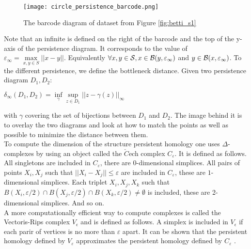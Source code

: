 \documentclass[12pt, a4paper]{article}
\begin{document}
\begin{figure}[p]
             \centering
            \texttt{[image: circle\_persistence\_barcode.png]}
        \caption{The barcode diagram of dataset from Figure \ref{fig:betti_s1}}
        \label{fig:persistence_barcode}
\end{figure}

Note that an infinite is defined on the right of the barcode and the top of the y-axis of the persistence diagram. It corresponds to the value of $\varepsilon_\infty = \max\limits_{x,y \in S} ||x-y||$. Equivalently $\forall x,y \in \mathcal{S}, x \in \mathcal{B}(y ,\varepsilon_\infty)$ and $y \in \mathcal{B}(x, \varepsilon_\infty)$. To the different persistence, we define the bottleneck distance. Given two persistence diagram $D_1, D_2$:

\begin{center}
  $\delta_\infty(D_1, D_2) = \inf\limits_{\gamma} \sup\limits_{z \in D_1} ||z - \gamma(z)||_\infty$
\end{center}

with $\gamma$ covering the set of bijections between $D_1$ and $D_2$. The image behind it is to overlay the two diagrams and look at how to match the points as well as possible to minimize the distance between them.\\

To compute the dimension of the structure persistent homology one uses $\Delta$-complexes by using an object called the $\check{C}$ech complex $C_\varepsilon$. It is defined as follows. All singletons are included in $C_\varepsilon$, there are $0$-dimensional simplices. All pairs of points $X_i, X_j$ such that $||X_i - X_j|| \le \varepsilon$ are included in $C_\varepsilon$, these are $1$-dimensional simplices. Each triplet $X_i, X_j, X_k$ such that $B(X_i, \varepsilon/2) \cap B(X_j, \varepsilon/2) \cap B(X_k, \varepsilon/2) \neq \emptyset$ is included, these are 2-dimensional simplices. And so on.\\ 

A more computationally efficient way to compute complexes is called the Vectoris-Rips complex $V_\epsilon$ and is defined as follows. A simplex is included in $V_\epsilon$ if each parir of vertices is no more than $\varepsilon$ apart. It can be shown that the persistent homology defined by $V_\varepsilon$ approximates the persistent homology defined by $C_\varepsilon$ .



\newpage
\thispagestyle{empty}
\mbox{}
\newpage
\end{document}
